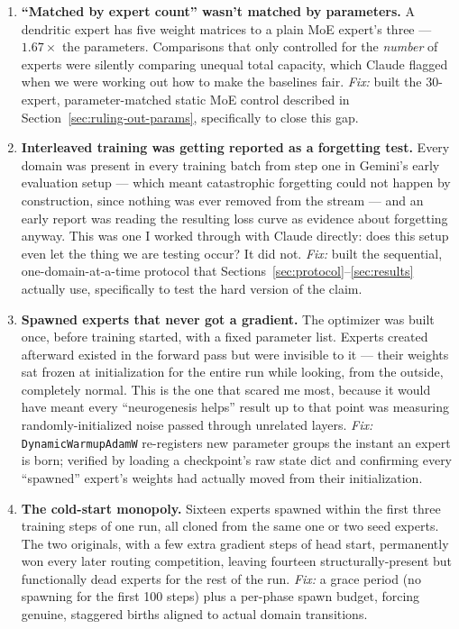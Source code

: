 \documentclass[11pt,letterpaper]{article}
\begin{document}
\begin{enumerate}[leftmargin=1.6em,itemsep=0.5em]
\item \textbf{``Matched by expert count'' wasn't matched by parameters.} A dendritic expert has five weight matrices to a plain MoE expert's three --- $1.67\times$ the parameters. Comparisons that only controlled for the \emph{number} of experts were silently comparing unequal total capacity, which Claude flagged when we were working out how to make the baselines fair. \emph{Fix:} built the 30-expert, parameter-matched static MoE control described in Section~\ref{sec:ruling-out-params}, specifically to close this gap.

\item \textbf{Interleaved training was getting reported as a forgetting test.} Every domain was present in every training batch from step one in Gemini's early evaluation setup --- which meant catastrophic forgetting could not happen by construction, since nothing was ever removed from the stream --- and an early report was reading the resulting loss curve as evidence about forgetting anyway. This was one I worked through with Claude directly: does this setup even let the thing we are testing occur? It did not. \emph{Fix:} built the sequential, one-domain-at-a-time protocol that Sections~\ref{sec:protocol}--\ref{sec:results} actually use, specifically to test the hard version of the claim.

\item \textbf{Spawned experts that never got a gradient.} The optimizer was built once, before training started, with a fixed parameter list. Experts created afterward existed in the forward pass but were invisible to it --- their weights sat frozen at initialization for the entire run while looking, from the outside, completely normal. This is the one that scared me most, because it would have meant every ``neurogenesis helps'' result up to that point was measuring randomly-initialized noise passed through unrelated layers. \emph{Fix:} \texttt{DynamicWarmupAdamW} re-registers new parameter groups the instant an expert is born; verified by loading a checkpoint's raw state dict and confirming every ``spawned'' expert's weights had actually moved from their initialization.

\item \textbf{The cold-start monopoly.} Sixteen experts spawned within the first three training steps of one run, all cloned from the same one or two seed experts. The two originals, with a few extra gradient steps of head start, permanently won every later routing competition, leaving fourteen structurally-present but functionally dead experts for the rest of the run. \emph{Fix:} a grace period (no spawning for the first 100 steps) plus a per-phase spawn budget, forcing genuine, staggered births aligned to actual domain transitions.


\end{enumerate}
\end{document}
